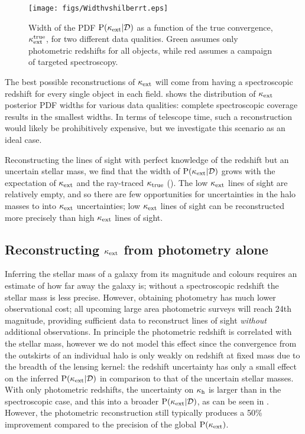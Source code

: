 \documentclass[useAMS,usenatbib,a4paper]{mn2e}
\begin{document}
\begin{figure}
\texttt{[image: figs/Widthvshilberrt.eps]}
\caption{Width of the \infered PDF ${\rm P}(\kappa_{\rm ext}|{\mathcal{D}})$ as a function of 
the true convergence, $\kappa_{\rm ext}^{\rm true}$, for two different data qualities. 
Green assumes only photometric redshifts for all objects,
while red assumes a campaign of targeted spectroscopy.}
\label{fig:widthsvsH}
\end{figure}

The best possible reconstructions of $\kappa_{\rm ext}$ will come from having a
spectroscopic redshift for every single object in each field.
 shows the distribution of $\kappa_{\rm ext}$ posterior 
PDF widths for various data qualities: complete spectroscopic coverage results
in the smallest widths. In terms of telescope time, such a reconstruction
would likely be prohibitively expensive, but we investigate this scenario as
an ideal case. 


Reconstructing the lines of sight with perfect knowledge of the
redshift but an uncertain stellar mass, we find that the width of
${\rm P}(\kappa_{\rm ext}|{\mathcal{D}})$ grows with the expectation of $\kappa_{\rm ext}$ and the ray-traced $\kappa_{\rm true}$
(). The low $\kappa_{\rm ext}$ lines of sight are relatively empty,
and so there are few opportunities for uncertainties in the halo masses to
\propogate into $\kappa_{\rm ext}$ uncertainties; low $\kappa_{\rm ext}$ lines of sight can be reconstructed
more precisely than high $\kappa_{\rm ext}$ lines of sight.



\subsection{Reconstructing $\kappa_{\rm ext}$ from photometry alone}

Inferring the stellar mass of a galaxy from its magnitude and colours requires
an estimate of how far away the galaxy is; without a spectroscopic redshift
the \infered stellar mass is less precise. However, obtaining photometry has
much lower observational cost; all upcoming large area photometric surveys
will reach 24th magnitude, providing sufficient data to reconstruct lines of
sight  {\it without} additional observations. In principle the photometric
redshift is correlated with the \infered stellar mass, however we do not model
this effect since the convergence from the outskirts of an individual halo is
only weakly \dependant on redshift at fixed mass due to the breadth of the
lensing kernel: the redshift uncertainty has only a small effect on the
inferred ${\rm P}(\kappa_{\rm ext}|{\mathcal{D}})$ in comparison to that of  the uncertain stellar
masses.  With only photometric redshifts, the uncertainty on $\kappa_{\rm h}$ is
larger than in the spectroscopic case, and this \propogates into a broader
${\rm P}(\kappa_{\rm ext}|{\mathcal{D}})$, as can be seen in . However, the
photometric reconstruction still typically produces a 50\% improvement
compared to the precision of the global ${\rm P}(\kappa_{\rm ext})$. 
\end{document}
